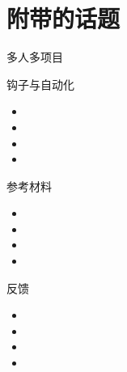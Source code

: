 \part{附带的话题}

\begin{frame}[<+->][fragile]{多人多项目}


\end{frame}


\begin{frame}[<+->][fragile]{钩子与自动化}
    \begin{itemize}
        \item 
        \item 
        \item 
        \item
    \end{itemize}
\end{frame}

\begin{frame}[<+->][fragile]{参考材料}
    \begin{itemize}
        \item 
        \item 
        \item 
        \item
    \end{itemize}
\end{frame}

\begin{frame}[<+->][fragile]{反馈}
    \begin{itemize}
        \item 
        \item 
        \item 
        \item
    \end{itemize}
\end{frame}

